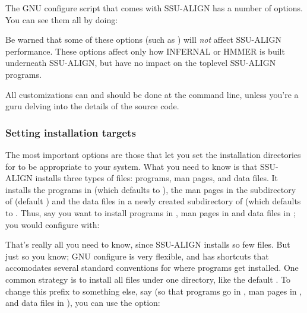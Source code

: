 The GNU configure script that comes with SSU-ALIGN has a
number of options. You can see them all by doing:


Be warned that some of these options (such as ) will
\emph{not} affect SSU-ALIGN performance. These options affect only how
INFERNAL or HMMER is built underneath SSU-ALIGN,
but have no impact on the toplevel SSU-ALIGN programs. 

All customizations can and should be done at the 
command line, unless you're a guru delving into the details of the
source code.

\subsubsection{Setting installation targets}

The most important options are those that let you set the installation
directories for  to be appropriate to your system.
What you need to know is that SSU-ALIGN installs three types
of files: programs, man pages, and data files. It installs the programs in
 (which defaults to ), the man pages in the
 subdirectory of  (default
) and the data files in a newly created
subdirectory  of  (which
defaults to . Thus, say you want
 to install programs in , man pages in
 and data files in ;
you would configure with:

\noindent {}

That's really all you need to know, since SSU-ALIGN installs
so few files. But just so you know; GNU configure is very flexible,
and has shortcuts that accomodates several standard conventions for
where programs get installed. One common strategy is to install all
files under one directory, like the default . To
change this prefix to something else, say 
(so that programs go in , man pages in
, and data files in
), you can use the
 option:


